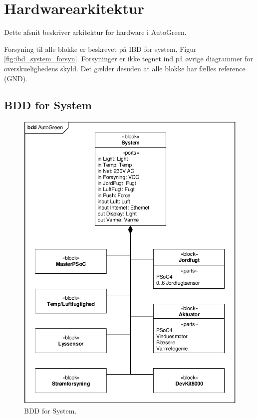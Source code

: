 \section{Hardwarearkitektur}
Dette afsnit beskriver arkitektur for hardware i AutoGreen.

Forsyning til alle blokke er beskrevet på IBD for system, Figur \ref{fig:ibd_system_forsyn}. Forsyninger er ikke tegnet ind på øvrige diagrammer for overskuelighedens skyld. Det gælder desuden at alle blokke har fælles reference (GND). 

\clearpage

\subsection{BDD for System}
\begin{figure}[h]
\centering 
\includegraphics[width={\textwidth-2cm}, trim=0 0 0 0, clip=true] {../fig/bdd_system.pdf}
\caption{BDD for System.}
\label{fig:bdd_system}
\end{figure}
\clearpage

